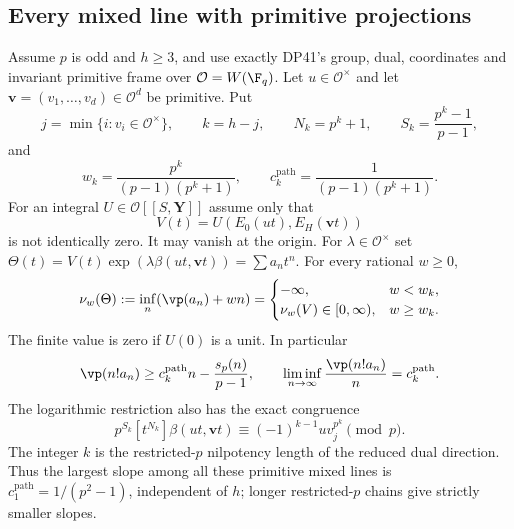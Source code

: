 \subsection{Every mixed line with primitive projections}

\begin{theorem}\label{DP42}
Assume $p$ is odd and $h\ge3$, and use exactly DP41's group, dual, coordinates and invariant primitive frame over $\mathcal O=W(\F_q)$. Let $u\in\mathcal O^\times$ and let $\mathbf v=(v_1,\ldots,v_d)\in\mathcal O^d$ be primitive. Put
\[
 j=\min\{i:v_i\in\mathcal O^\times\},\qquad k=h-j,\qquad
 N_k=p^k+1,\qquad S_k=\frac{p^k-1}{p-1},
\]
and
\[
 w_k=\frac{p^k}{(p-1)(p^k+1)},\qquad
 c_k^{\mathrm{path}}=\frac1{(p-1)(p^k+1)}.
\]
For an integral $U\in\mathcal O[[S,\mathbf Y]]$ assume only that
\[
 V(t)=U(E_0(ut),E_H(\mathbf vt))
\]
is not identically zero. It may vanish at the origin. For $\lambda\in\mathcal O^\times$ set
$\Theta(t)=V(t)\exp(\lambda\beta(ut,\mathbf vt))=\sum a_nt^n$.
For every rational $w\ge0$,
\[
 \nu_w(\Theta):=\inf_n(\vp(a_n)+wn)=
 \begin{cases}
 -\infty,&w<w_k,\\
 \nu_w(V)\in[0,\infty),&w\ge w_k.
 \end{cases}
\]
The finite value is zero if $U(0)$ is a unit. In particular
\begin{equation}\label{eq:pathsharp}
 \vp(n!a_n)\ge c_k^{\mathrm{path}}n-\frac{s_p(n)}{p-1},
 \qquad
 \liminf_{n\to\infty}\frac{\vp(n!a_n)}n=c_k^{\mathrm{path}}.
\end{equation}
The logarithmic restriction also has the exact congruence
\begin{equation}\label{eq:pathcoefficient}
 p^{S_k}[t^{N_k}]\beta(ut,\mathbf vt)
       \equiv(-1)^{k-1}u v_j^{p^k}\pmod p.
\end{equation}
The integer $k$ is the restricted-$p$ nilpotency length of the reduced dual direction. Thus the largest slope among all these primitive mixed lines is
$c_1^{\mathrm{path}}=1/(p^2-1)$, independent of $h$; longer restricted-$p$ chains give strictly smaller slopes.
\end{theorem}

